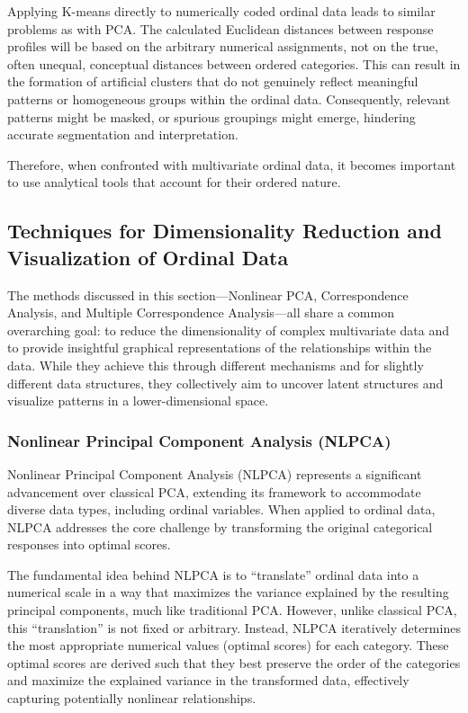 \documentclass[
  letterpaper,
  DIV=11,
  numbers=noendperiod]{scrartcl}
\begin{document}
Applying K-means directly to numerically coded ordinal data leads to
similar problems as with PCA. The calculated Euclidean distances between
response profiles will be based on the arbitrary numerical assignments,
not on the true, often unequal, conceptual distances between ordered
categories. This can result in the formation of artificial clusters that
do not genuinely reflect meaningful patterns or homogeneous groups
within the ordinal data. Consequently, relevant patterns might be
masked, or spurious groupings might emerge, hindering accurate
segmentation and interpretation.

Therefore, when confronted with multivariate ordinal data, it becomes
important to use analytical tools that account for their ordered nature.

\hypertarget{techniques-for-dimensionality-reduction-and-visualization-of-ordinal-data}{%
\subsection{Techniques for Dimensionality Reduction and Visualization of
Ordinal
Data}\label{techniques-for-dimensionality-reduction-and-visualization-of-ordinal-data}}

The methods discussed in this section---Nonlinear PCA, Correspondence
Analysis, and Multiple Correspondence Analysis---all share a common
overarching goal: to reduce the dimensionality of complex multivariate
data and to provide insightful graphical representations of the
relationships within the data. While they achieve this through different
mechanisms and for slightly different data structures, they collectively
aim to uncover latent structures and visualize patterns in a
lower-dimensional space.

\hypertarget{nonlinear-principal-component-analysis-nlpca}{%
\subsubsection{Nonlinear Principal Component Analysis
(NLPCA)}\label{nonlinear-principal-component-analysis-nlpca}}

Nonlinear Principal Component Analysis (NLPCA) represents a significant
advancement over classical PCA, extending its framework to accommodate
diverse data types, including ordinal variables. When applied to ordinal
data, NLPCA addresses the core challenge by transforming the original
categorical responses into optimal scores.

The fundamental idea behind NLPCA is to ``translate'' ordinal data into
a numerical scale in a way that maximizes the variance explained by the
resulting principal components, much like traditional PCA. However,
unlike classical PCA, this ``translation'' is not fixed or arbitrary.
Instead, NLPCA iteratively determines the most appropriate numerical
values (optimal scores) for each category. These optimal scores are
derived such that they best preserve the order of the categories and
maximize the explained variance in the transformed data, effectively
capturing potentially nonlinear relationships.
\end{document}
